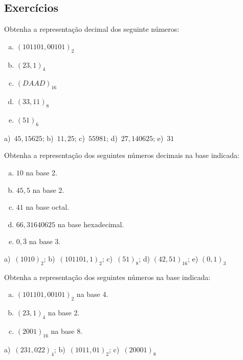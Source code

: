 \subsection{Exercícios}

\begin{exer}
  Obtenha a representação decimal dos seguinte números:
  \begin{enumerate}[a)]
  \item $(101101,00101)_2$
  \item $(23,1)_4$
  \item $(DAAD)_{16}$
  \item $(33,11)_8$
  \item $(51)_6$
  \end{enumerate}
\end{exer}
\begin{resp}
  a)~$45,15625$; b)~$11,25$; c)~$55981$; d)~$27,140625$; e)~$31$
\end{resp}

\begin{exer}
  Obtenha a representação dos seguintes números decimais na base indicada:
  \begin{enumerate}[a)]
  \item $10$ na base 2.
  \item $45,5$ na base 2.
  \item $41$ na base octal.
  \item $66,31640625$ na base hexadecimal.
  \item $0,\overline{3}$ na base 3.
  \end{enumerate}
\end{exer}
\begin{resp}
  a)~$(1010)_2$; b)~$(101101,1)_2$; c)~$(51)_8$; d) $(42,51)_{16}$; e) $(0,1)_3$
\end{resp}

\begin{exer}
  Obtenha a representação dos seguintes números na base indicada:
  \begin{enumerate}[a)]
  \item $(101101,00101)_2$ na base 4.
  \item $(23,1)_4$ na base 2.
  \item $(2001)_{16}$ na base 8.
  \end{enumerate}
\end{exer}
\begin{resp}
   a)~$(231,022)_4$; b)~$(1011,01)_2$; c)~$(20001)_8$
\end{resp}

